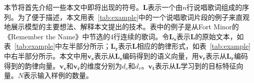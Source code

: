 本节将首先介绍一些本文中即将出现的符号。$\bm L$表示一个由$n$行说唱歌词组成的序列。为了便于描述，本文用表~\ref{tab:example}中的一个说唱歌词片段的例子来直观地展示模型的主要想法、解释本文提出的技术。表中的例子是从Fort Minor的《Remember the Name》中节选的4行连续的歌词。令$\bm {L_s}$表示$\bm L$的原始文本，如表~\ref{tab:example}中左半部分所示；$\bm {{L}_r}$表示$\bm L$相应的韵律形式，如表~\ref{tab:example}中右半部分所示。本文中用$\bm {v_s}$表示从$\bm {L_s}$编码得到的语义向量，用$\bm {v_r}$表示从$\bm {L_r}$编码得到的韵律向量。$\bm {v_s}$和$\bm {v_r}$的维度分别为$d_s$和$d_r$。$\bm {v_t}$表示从$\bm L$学习到的目标特征向量。$N$表示输入样例的数量。\par




\begin{table}[h]
\centering
\caption{主要符号定义}
\label{table:def}
\renewcommand{\arraystretch}{1}
\end{table}

